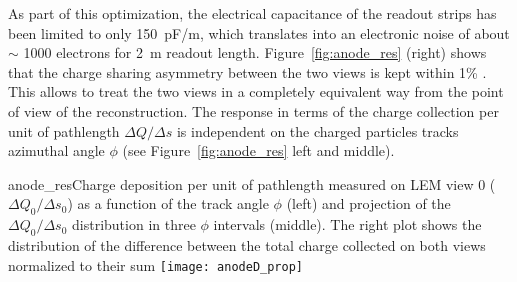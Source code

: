 As part of this optimization, the electrical capacitance of the
readout strips has been limited to only 150~pF/m, which translates
into an electronic noise of about $\sim$ 1000 electrons for 2~m readout
length.  Figure~\ref{fig:anode_res} (right) shows that the charge
sharing asymmetry between the two views is kept within 1\% . This
allows to treat the two views in a completely equivalent way from the
point of view of the reconstruction. The response in terms of the
charge collection per unit of pathlength $\Delta Q/\Delta s$ is
independent on the charged particles tracks azimuthal angle $\phi$ (see
Figure~\ref{fig:anode_res} left and middle).
\begin{cdrfigure}{anode_res}{Charge deposition per unit of pathlength measured on LEM view 0 ( $\Delta Q_0/\Delta s_0$) as a function  of the track angle $\phi$ (left) and projection of the  $\Delta Q_0/\Delta s_0$ distribution in three $\phi$ intervals (middle). The right plot  shows the distribution of the difference between the total charge  collected on both views normalized to their sum}
\texttt{[image: anodeD\_prop]}
\end{cdrfigure}

